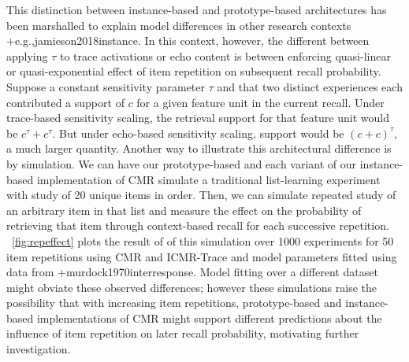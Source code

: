 {}This distinction between instance-based and prototype-based architectures has been marshalled to explain model differences in other research contexts +{e.g.,}{}{jamieson2018instance}. In this context, however, the different between applying $\tau$ to trace activations or echo content is between enforcing quasi-linear or quasi-exponential effect of item repetition on subsequent recall probability. Suppose a constant sensitivity parameter $\tau$ and that two distinct experiences each contributed a support of $c$ for a given feature unit in the current recall. Under trace-based sensitivity scaling, the retrieval support for that feature unit would be $c^{\tau} + c^{\tau}$. But under echo-based sensitivity scaling, support would be ${(c + c)}^{\tau}$, a much larger quantity.\markdownRendererInterblockSeparator
{}Another way to illustrate this architectural difference is by simulation. We can have our prototype-based and each variant of our instance-based implementation of CMR simulate a traditional list-learning experiment with study of 20 unique items in order. Then, we can simulate repeated study of an arbitrary item in that list and measure the effect on the probability of retrieving that item through context-based recall for each successive repetition. ~\ref{fig:repeffect} plots the result of of this simulation over 1000 experiments for 50 item repetitions using CMR and ICMR-Trace and model parameters fitted using data from +{}{}{murdock1970interresponse}. Model fitting over a different dataset might obviate these observed differences; however these simulations raise the possibility that with increasing item repetitions, prototype-based and instance-based implementations of CMR might support different predictions about the influence of item repetition on later recall probability, motivating further investigation.\relax